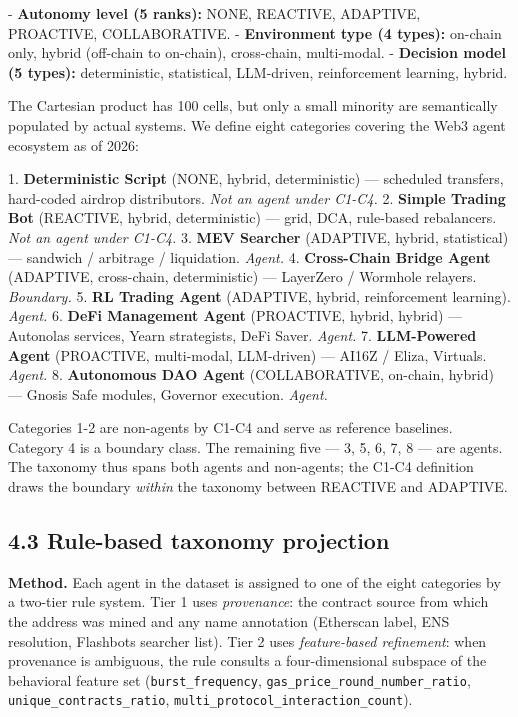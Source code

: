 \documentclass[sigconf,nonacm=false]{acmart}
\begin{document}
- \textbf{Autonomy level (5 ranks):} NONE, REACTIVE, ADAPTIVE, PROACTIVE, COLLABORATIVE.
- \textbf{Environment type (4 types):} on-chain only, hybrid (off-chain to on-chain), cross-chain, multi-modal.
- \textbf{Decision model (5 types):} deterministic, statistical, LLM-driven, reinforcement learning, hybrid.

The Cartesian product has 100 cells, but only a small minority are semantically populated by actual systems. We define eight categories covering the Web3 agent ecosystem as of 2026:

1. \textbf{Deterministic Script} (NONE, hybrid, deterministic) --- scheduled transfers, hard-coded airdrop distributors. \textit{Not an agent under C1-C4.}
2. \textbf{Simple Trading Bot} (REACTIVE, hybrid, deterministic) --- grid, DCA, rule-based rebalancers. \textit{Not an agent under C1-C4.}
3. \textbf{MEV Searcher} (ADAPTIVE, hybrid, statistical) --- sandwich / arbitrage / liquidation. \textit{Agent.}
4. \textbf{Cross-Chain Bridge Agent} (ADAPTIVE, cross-chain, deterministic) --- LayerZero / Wormhole relayers. \textit{Boundary.}
5. \textbf{RL Trading Agent} (ADAPTIVE, hybrid, reinforcement learning). \textit{Agent.}
6. \textbf{DeFi Management Agent} (PROACTIVE, hybrid, hybrid) --- Autonolas services, Yearn strategists, DeFi Saver. \textit{Agent.}
7. \textbf{LLM-Powered Agent} (PROACTIVE, multi-modal, LLM-driven) --- AI16Z / Eliza, Virtuals. \textit{Agent.}
8. \textbf{Autonomous DAO Agent} (COLLABORATIVE, on-chain, hybrid) --- Gnosis Safe modules, Governor execution. \textit{Agent.}

Categories 1-2 are non-agents by C1-C4 and serve as reference baselines. Category 4 is a boundary class. The remaining five --- 3, 5, 6, 7, 8 --- are agents. The taxonomy thus spans both agents and non-agents; the C1-C4 definition draws the boundary \textit{within} the taxonomy between REACTIVE and ADAPTIVE.

\subsection{4.3 Rule-based taxonomy projection}

\textbf{Method.} Each agent in the dataset is assigned to one of the eight categories by a two-tier rule system. Tier 1 uses \textit{provenance}: the contract source from which the address was mined and any name annotation (Etherscan label, ENS resolution, Flashbots searcher list). Tier 2 uses \textit{feature-based refinement}: when provenance is ambiguous, the rule consults a four-dimensional subspace of the behavioral feature set (\texttt{burst\_frequency}, \texttt{gas\_price\_round\_number\_ratio}, \texttt{unique\_contracts\_ratio}, \texttt{multi\_protocol\_interaction\_count}).
\end{document}
